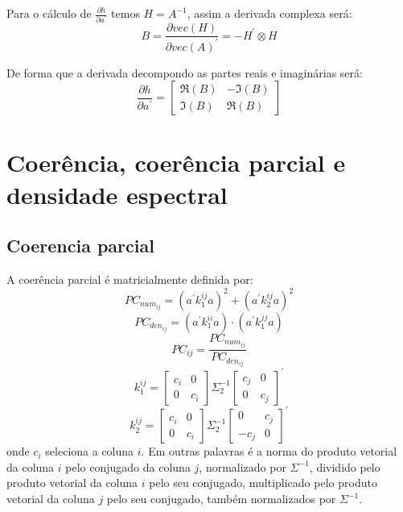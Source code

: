 \documentclass[a4paper,10pt]{article}
\begin{document}
Para o cálculo de $\frac{\partial h}{\partial a^{'}}$ temos $H = A^{-1}$, assim a derivada complexa será:
\begin{equation}
B = \frac{\partial vec(H)}{\partial vec(A)^{'}} = -H^{'} \otimes H
\end{equation}

De forma que a derivada decompondo as partes reais e imaginárias será:
\begin{equation}
\frac{\partial h}{\partial a^{'}} = \left[ \begin{array}{cc} \Re(B) & -\Im(B) \\ \Im(B) & \Re(B)
\end{array} \right]
\end{equation}

\section{Coerência, coerência parcial e densidade espectral}

\subsection{Coerencia parcial}

A coerência parcial é matricialmente definida por:
\begin{equation}
PC_{num_{ij}} = \left( a^{'} k_{1}^{ij} a \right)^{2} + \left( a^{'} k_{2}^{ij} a \right)^{2}
\end{equation}
\begin{equation}
PC_{den_{ij}} = \left( a^{'} k_{1}^{ii} a \right) \cdot \left( a^{'} k_{1}^{jj} a \right)
\end{equation}
\begin{equation}
PC_{ij} = \frac{PC_{num_{ij}}}{PC_{den_{ij}}}
\end{equation}
\begin{equation}
k_{1}^{ij} = \left[ \begin{array}{cc}
 c_{i} & 0 \\ 0 & c_{i}
\end{array} \right] \Sigma_{2}^{-1} \left[ \begin{array}{cc}
 c_{j} & 0 \\ 0 & c_{j}
\end{array} \right]^{'}
\end{equation}
\begin{equation}
k_{2}^{ij} = \left[ \begin{array}{cc}
 c_{i} & 0 \\ 0 & c_{i}
\end{array} \right] \Sigma_{2}^{-1} \left[ \begin{array}{cc}
 0 & c_{j} \\ -c_{j} & 0
\end{array} \right]^{'} 
\end{equation}
onde $c_i$ seleciona a coluna $i$. Em outras palavras é a norma do produto vetorial da coluna $i$ pelo conjugado da coluna $j$, normalizado por $\Sigma^{-1}$, dividido pelo produto vetorial da coluna $i$ pelo seu conjugado, multiplicado pelo produto vetorial da coluna $j$ pelo seu conjugado, também normalizados por $\Sigma^{-1}$.
\end{document}
